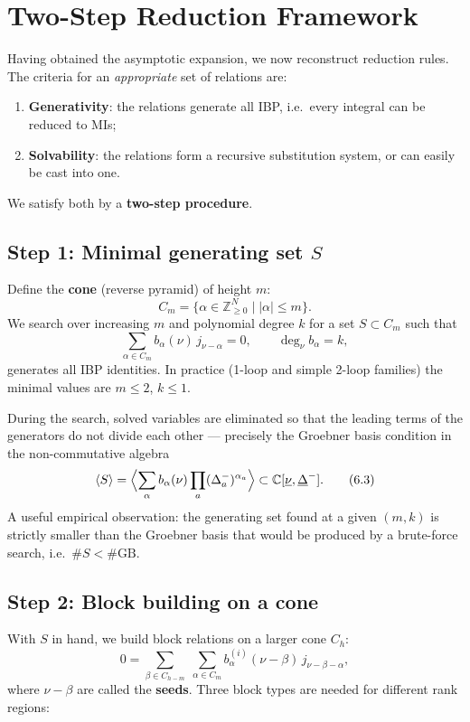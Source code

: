 \documentclass[12pt]{article}
\newcommand{\Z}{\mathbb{Z}}
\begin{document}
\section{Two-Step Reduction Framework}\label{sec:reduction}

Having obtained the asymptotic expansion, we now reconstruct reduction rules.
The criteria for an \emph{appropriate} set of relations are:
\begin{enumerate}
  \item \textbf{Generativity}: the relations generate all IBP, i.e.\ every integral
        can be reduced to MIs;
  \item \textbf{Solvability}: the relations form a recursive substitution system,
        or can easily be cast into one.
\end{enumerate}
We satisfy both by a \textbf{two-step procedure}.

\subsection{Step 1: Minimal generating set $S$}

Define the \textbf{cone} (reverse pyramid) of height $m$:
\[
  C_m = \{\alpha\in\Z_{\ge0}^N \mid |\alpha|\le m\}.
\tag{6.1}\label{eq:cone}
\]
We search over increasing $m$ and polynomial degree $k$ for a set $S\subset C_m$
such that
\[
  \sum_{\alpha\in C_m} b_{\alpha}(\nu)\,j_{\nu-\alpha}=0,
  \qquad \deg_{\nu}b_{\alpha}=k,
\tag{6.2}\label{eq:search}
\]
generates all IBP identities.  In practice (1-loop and simple 2-loop families)
the minimal values are $m\le2$, $k\le1$.

During the search, solved variables are eliminated so that the leading terms of
the generators do not divide each other --- precisely the Groebner basis
condition in the non-commutative algebra
\[
  \langle S\rangle
  =\Bigl\langle\sum_{\alpha}b_{\alpha}(\nu)
              \prod_a(\Delta_a^{-})^{\alpha_a}\Bigr\rangle
  \subset \mathbb C[\underline\nu,\underline\Delta^{-}] .
\tag{6.3}\label{eq:noncomm_gb}
\]
A useful empirical observation: the generating set found at a given $(m,k)$ is
strictly smaller than the Groebner basis that would be produced by a
brute-force search, i.e.\ $\#S < \#\text{GB}$.

\subsection{Step 2: Block building on a cone}

With $S$ in hand, we build block relations on a larger cone $C_h$:
\[
  0 = \sum_{\beta\in C_{h-m}}\;\sum_{\alpha\in C_m}
      b_{\alpha}^{(i)}(\nu-\beta)\,j_{\nu-\beta-\alpha},
\tag{6.4}\label{eq:block}
\]
where $\nu-\beta$ are called the \textbf{seeds}.  Three block types are needed
for different rank regions:
\end{document}
